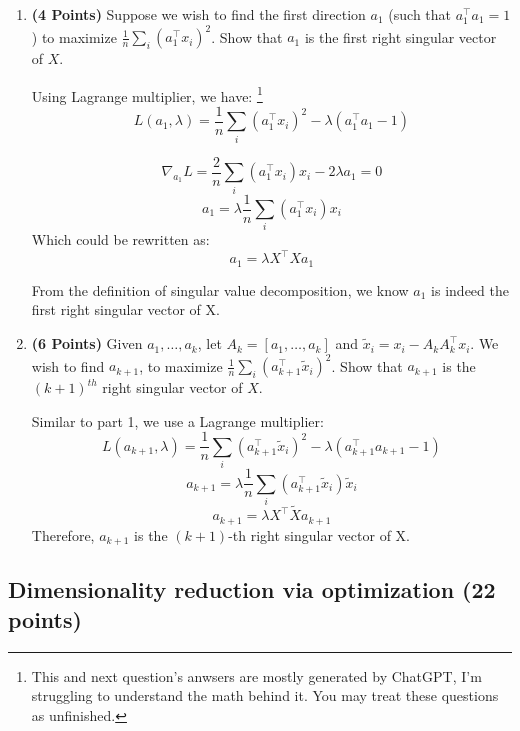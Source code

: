 \documentclass[a4paper]{article}
\theoremstyle{definition}
\newenvironment{soln}{
    \leavevmode\color{blue}\ignorespaces
}{}
\begin{document}
\begin{enumerate}

	\item  \textbf{(4 Points)}
	      Suppose we wish to find the first direction $a_1$ (such that $a_1^\top a_1 = 1$) to maximize $\frac{1}{n} \sum_i (a_1^\top x_i)^2$.
	      Show that $a_1$ is the first right singular vector of $X$.

	      \begin{soln}
		      Using Lagrange multiplier, we have: \footnote{This and next question's anwsers are mostly generated by ChatGPT, I'm struggling to understand the math behind it. You may treat these questions as unfinished.}
		      \[L(a_1, \lambda) = \frac{1}{n} \sum_i (a_1^\top x_i)^2 - \lambda(a_1^\top a_1 - 1)\]

		      \[\nabla_{a_1} L = \frac{2}{n} \sum_i (a_1^\top x_i)x_i - 2\lambda a_1 = 0\]
		      \[a_1 = \lambda \frac{1}{n} \sum_i (a_1^\top x_i)x_i\]
		      Which could be rewritten as:
		      \[a_1 = \lambda X^\top X a_1\]

		      From the definition of singular value decomposition, we know $a_1$ is indeed the first right singular vector of X.

	      \end{soln}

	\item  \textbf{(6 Points)}
	      Given $a_1, \dots, a_k$, let $A_k = [a_1, \dots, a_k]$ and
	      $\tilde{x}_i = x_i - A_kA_k^\top x_i$. We wish to find $a_{k+1}$, to maximize
	      $\frac{1}{n} \sum_i (a_{k+1}^\top \tilde{x}_i)^2$. Show that $a_{k+1}$ is the
	      $(k+1)^{th}$ right singular vector of $X$.

	      \begin{soln}
		      Similar to part 1, we use a Lagrange multiplier:
		      \[L(a_{k+1}, \lambda) = \frac{1}{n} \sum_i (a_{k+1}^\top \tilde{x}_i)^2 - \lambda(a_{k+1}^\top a_{k+1} - 1)\]
		      \[a_{k+1} = \lambda \frac{1}{n} \sum_i (a_{k+1}^\top \tilde{x}_i)\tilde{x}_i\]
		      \[a_{k+1} = \lambda X^\top \tilde{X} a_{k+1}\]
		      Therefore, $a_{k+1}$ is the $(k+1)$-th right singular vector of X.
	      \end{soln}


\end{enumerate}


\subsection{Dimensionality reduction via optimization (22 points)}
\end{document}
